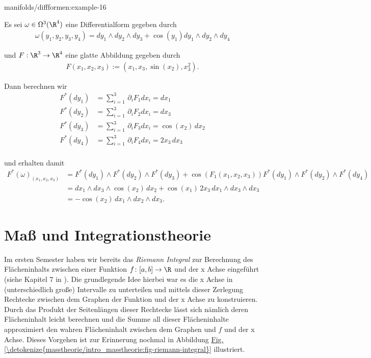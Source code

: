 \documentclass[letterpaper,10pt,english]{jupyterBook}
\begin{document}
\begin{example}{}{manifolds/diffformen:example-16}



\par
Es sei \(\omega\in \Omega^3(\R^4)\) eine Differentialform gegeben durch
\begin{align*}
\omega(y_1,y_2,y_3,y_4) = dy_1\wedge dy_2\wedge dy_3 + \cos(y_1)dy_1\wedge dy_2 \wedge dy_4
\end{align*}
\par
und \(F:\R^3\to\R^4\) eine glatte Abbildung gegeben durch
\begin{align*}
F(x_1,x_2,x_3) := (x_1, x_3, \sin(x_2), x_3^2).
\end{align*}
\par
Dann berechnen wir
\begin{align*}
F^\ast(dy_1) &= \sum_{i=1}^3 \,\partial_i F_1 dx_i = dx_1\\
F^\ast(dy_2) &= \sum_{i=1}^3 \,\partial_i F_2 dx_i = dx_3\\
F^\ast(dy_3) &= \sum_{i=1}^3 \,\partial_i F_3 dx_i = \cos(x_2)\,dx_2\\
F^\ast(dy_4) &= \sum_{i=1}^3 \,\partial_i F_4 dx_i = 2x_3\,dx_3\\
\end{align*}
\par
und erhalten damit
\begin{align*}
F^\ast(\omega)_{(x_1,x_2,x_3)} &= F^\ast(dy_1)\wedge F^\ast(dy_2)\wedge F^\ast(dy_3) + 
\cos(F_1(x_1,x_2,x_3)) F^\ast(dy_1)\wedge F^\ast(dy_2)\wedge F^\ast(dy_4)\\
&= dx_1 \wedge dx_3\wedge \cos(x_2)\,dx_2 + \cos(x_1)\, 2x_3\,dx_1\wedge dx_3\wedge dx_3\\
&=  -\cos(x_2)\,dx_1 \wedge dx_2\wedge dx_3.
\end{align*}\end{example}


\chapter{Maß  und Integrationstheorie}
\label{\detokenize{masstheorie/intro_masstheorie:masz-und-integrationstheorie}}\label{\detokenize{masstheorie/intro_masstheorie::doc}}
\par
Im ersten Semester haben wir bereits das \emph{Riemann Integral} zur Berechnung des Flächeninhalts zwischen einer Funktion \(f \colon [a,b] \rightarrow \R\) und der x Achse eingeführt (siehe Kapitel 7 in \cite{Bur20}).
Die grundlegende Idee hierbei war es die x Achse in (unterschiedlich große) Intervalle zu unterteilen und mittels dieser Zerlegung Rechtecke zwischen dem Graphen der Funktion und der x Achse zu konstruieren.
Durch das Produkt der Seitenlängen dieser Rechtecke lässt sich nämlich deren Flächeninhalt leicht berechnen und die Summe all dieser Flächeninhalte approximiert den wahren Flächeninhalt zwischen dem Graphen und \(f\) und der x Achse.
Dieses Vorgehen ist zur Erinnerung nochmal in Abbildung \hyperref[\detokenize{masstheorie/intro_masstheorie:fig-riemann-integral}]{Fig.\@ \ref{\detokenize{masstheorie/intro_masstheorie:fig-riemann-integral}}} illustriert.
\end{document}
